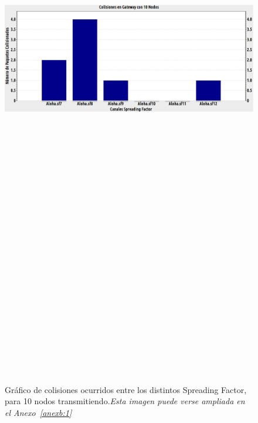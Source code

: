 \begin{justify}
\begin{figure}[!ht]
\centering
\includegraphics[width=13cm,height=30cm,keepaspectratio]{images/colisiones10nodos.eps}
\caption{Gráfico de colisiones ocurridos entre los distintos Spreading Factor, para 10 nodos transmitiendo.\textit{Esta imagen puede verse ampliada en el Anexo~\ref{anexb:1}}}
\label{nodos:10}
\end{figure}


\end{justify}
